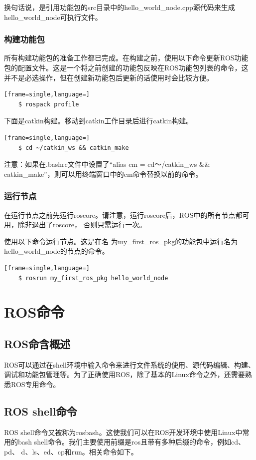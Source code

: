 \documentclass[geye,green,kindle,cn]{elegantnote}
\begin{document}
换句话说，是引用功能包的src目录中的hello\_world\_node.cpp源代码来生成hello\_world\_node可执行文件。
\subsubsection{构建功能包}
所有构建功能包的准备工作都已完成。在构建之前，使用以下命令更新ROS功能包的配置文件。这是一个将之前创建的功能包反映在ROS功能包列表的命令，这并不是必选操作，但在创建新功能包后更新的话使用时会比较方便。
\begin{lstlisting}[frame=single,language=]
    $ rospack profile 
\end{lstlisting}

下面是catkin构建。移动到catkin工作目录后进行catkin构建。 
\begin{lstlisting}[frame=single,language=]
    $ cd ~/catkin_ws && catkin_make 
\end{lstlisting}

注意：如果在.bashrc文件中设置了“alias cm = cd〜/catkin\_ws \&\& catkin\_make”，则可以用终端窗口中的cm命令替换以前的命令。
\subsubsection{运行节点}
在运行节点之前先运行roscore。请注意，运行roscore后，ROS中的所有节点都可用，除非退出了roscore， 否则只需运行一次。 

使用以下命令运行节点。这是在名 为my\_first\_ros\_pkg的功能包中运行名为hello\_world\_node的节点的命令。 
\begin{lstlisting}[frame=single,language=]
    $ rosrun my_first_ros_pkg hello_world_node
\end{lstlisting}
\section{ROS命令}
\subsection{ROS命含概述}
ROS可以通过在shell环境中输入命令来进行文件系统的使用、源代码编辑、构建、调试和功能包管理等。为了正确使用ROS，除了基本的Linux命令之外，还需要熟悉ROS专用命令。
\subsection{ROS shell命令}
ROS shell命令又被称为rosbash。这使我们可以在ROS开发环境中使用Linux中常用的bash shell命令。我们主要使用前缀是ros且带有多种后缀的命令，例如cd、pd、 d、ls、ed、cp和run。相关命令如下。
\end{document}
